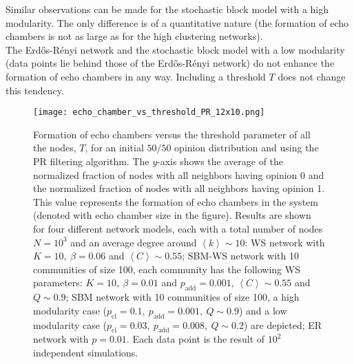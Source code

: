 \documentclass[11 pt , letterpaper , twoside , openright]{book}
\begin{document}
Similar observations can be made for the stochastic block model with a high modularity. The only difference is of a quantitative nature (the formation of echo chambers is not as large as for the high clustering networks).\\
The Erd\H{o}s-R\'{e}nyi network and the stochastic block model with a low modularity (data points lie behind those of the Erd\H{o}s-R\'{e}nyi network) do not enhance the formation of echo chambers in any way. Including a threshold $T$ does not change this tendency. %
\newpage
\begin{figure}[H]
	\texttt{[image: echo\_chamber\_vs\_threshold\_PR\_12x10.png]}
	\captionsetup{format=plain}
	\caption[Formation of echo chambers versus the threshold parameter of all the nodes, $T$, for the PR filtering algorithm and an initial $50/50$ opinion distribution.]{Formation of echo chambers versus the threshold parameter of all the nodes, $T$, for an initial $50/50$ opinion distribution and using the PR filtering algorithm. The $y$-axis shows the average of the normalized fraction of nodes with all neighbors having opinion 0 and the normalized fraction of nodes with all neighbors having opinion 1. This value represents the formation of echo chambers in the system (denoted with echo chamber size in the figure). Results are shown for four different network models, each with a total number of nodes $N=10^3$ and an average degree around $\left<k\right> \sim 10$: WS network with $K =10,\ \beta = 0.06$ and $\left<C\right> \sim 0.55$; SBM-WS network with 10 communities of size 100, each community has the following WS parameters: $K = 10,\ \beta = 0.01$ and $p_{\text{add}} = 0.001$, $\left<C\right> \sim 0.55$ and $Q \sim 0.9$; SBM network with 10 communities of size 100, a high modularity case ($p_{\text{cl}} = 0.1,\ p_{\text{add}} = 0.001,\ Q \sim 0.9$) and a low modularity case ($p_{\text{cl}} = 0.03,\ p_{\text{add}} = 0.008,\ Q \sim 0.2$) are depicted; ER network with $p= 0.01$. Each data point is the result of $10^2$ independent simulations.}
\label{echo_vs_threshold_PR}
\end{figure}
\noindent
\end{document}
